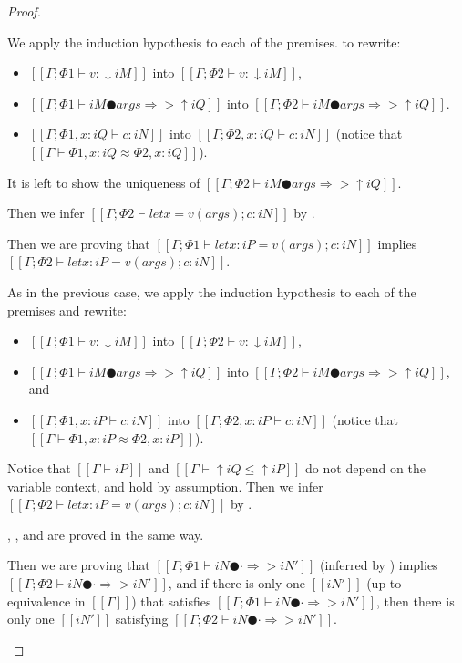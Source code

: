\begin{proof}
\begin{caseof}
            We apply the induction hypothesis to each of the premises.
            to rewrite:
            \begin{itemize}
                \item $[[Γ ; Φ1 ⊢ v : ↓iM]]$ into $[[Γ ; Φ2 ⊢ v : ↓iM]]$,
                \item $[[Γ ; Φ1 ⊢ iM ● args ⇒> ↑iQ]]$ into $[[Γ ; Φ2 ⊢ iM ● args ⇒> ↑iQ]]$.
                \item $[[Γ ; Φ1, x:iQ ⊢ c : iN]]$ into $[[Γ ; Φ2, x:iQ ⊢ c : iN]]$
                (notice that $[[Γ ⊢ Φ1, x:iQ ≈ Φ2, x:iQ]]$).
            \end{itemize}

            It is left to show the uniqueness of $[[Γ ; Φ2 ⊢ iM ● args ⇒> ↑iQ]]$.

            Then we infer $[[Γ ; Φ2 ⊢ let x = v(args); c : iN]]$ by .


        \item {}
            Then we are proving that
            $[[Γ ; Φ1 ⊢ let x:iP = v(args); c : iN]]$ implies
            $[[Γ ; Φ2 ⊢ let x:iP = v(args); c : iN]]$.
        
            As in the previous case, we apply the induction hypothesis to each of the premises
            and rewrite:
            \begin{itemize}
                \item $[[Γ ; Φ1 ⊢ v : ↓iM]]$ into $[[Γ ; Φ2 ⊢ v : ↓iM]]$,
                \item $[[Γ ; Φ1 ⊢ iM ● args ⇒> ↑iQ]]$ into $[[Γ ; Φ2 ⊢ iM ● args ⇒> ↑iQ]]$, 
                    and
                \item $[[Γ ; Φ1, x:iP ⊢ c : iN]]$ into $[[Γ ; Φ2, x:iP ⊢ c : iN]]$
                (notice that $[[Γ ⊢ Φ1, x:iP ≈ Φ2, x:iP]]$).
            \end{itemize}
            
            Notice that $[[Γ ⊢ iP]]$ and $[[Γ ⊢ ↑iQ ≤ ↑iP]]$ 
            do not depend on the variable context, and hold by assumption.
            Then we infer $[[Γ ; Φ2 ⊢ let x:iP = v(args); c : iN]]$ by .

        \item {}, , and 
            are proved in the same way.

        \item {}
            Then we are proving that 
            $[[Γ ; Φ1 ⊢ iN ● · ⇒> iN']]$ (inferred by )
            implies $[[Γ ; Φ2 ⊢ iN ● · ⇒> iN']]$,
            and if there is only one $[[iN']]$ (up-to-equivalence in $[[Γ]]$) 
            that satisfies $[[Γ ; Φ1 ⊢ iN ● · ⇒> iN']]$,
            then there is only one $[[iN']]$ satisfying $[[Γ ; Φ2 ⊢ iN ● · ⇒> iN']]$.


\end{caseof}
\end{proof}

